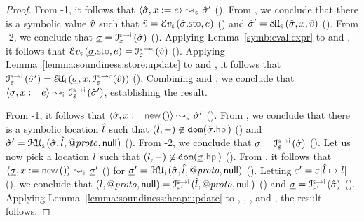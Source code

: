 \begin{proof}
 \noindent {} From \hyp{1}, it follows that $\absbsemrule{\sstate, \jvar := \jsilexpr}{\sstate'}{\symbolic}$ (). 
From , we conclude that there is a symbolic value $\hat{v}$ such that 
$\sexprv = \evalexpr{\symbolic}(\sstate.\stosel, \jsilexpr)$ () and $\sstate' = \stupdt{\symbolic}(\sstate, \jvar, \sexprv)$ (). 
From \hyp{2}, we conclude that $\istate = \interpret{\symbinst}{\senv}(\sstate)$ (). 
Applying Lemma~\ref{symb:eval:expr} to  and , it follows that 
$\evalexpr{\symbolic}(\istate.\stosel, \jsilexpr) = \interpret{\symbconc}{\senv}(\sexprv)$ (). 
Applying Lemma~\ref{lemma:soundiness:store:update} to  and , it follows
that $ \interpret{\symbinst}{\senv}(\sstate') = \stupdt{\instrumented}(\istate, \jvar, \interpret{\symbconc}{\senv}(\sexprv))$ (). 
Combining  and , we conclude that $\absbsemrule{\istate,\jvar := \jsilexpr}{\interpret{\symbinst}{\senv}(\sstate')}{\instrumented}$, establishing the result. 
\vspace{5pt}

 \noindent {} From \hyp{1}, it follows that $\absbsemrule{\sstate, \jvar := \jsilnew()}{\sstate'}{\symbolic}$ (). 
From , we conclude that there is a symbolic location $\hat{l}$ such that $(\sloc, -) \not\in \domain(\sstate.\hpsel)$ () and 
$\sstate' = \hpupdt{\symbolic}(\sstate, \sloc, \protop, \jnull)$ (). From \hyp{2}, 
we conclude that $\istate = \interpret{\symbinst}{\senv}(\sstate)$ (). 
Let us now pick a location $l$ such that $(\loc, -) \not\in \domain(\istate.\hpsel)$ (). 
From , it follows that $\absbsemrule{\istate, \jvar := \jsilnew()}{\istate'}{\instrumented}$ () for 
$\istate' = \hpupdt{\instrumented}(\sstate, \sloc, \protop, \jnull)$ (). 
Letting $\varepsilon' = \varepsilon[\hat{l} \mapsto l]$ (), we conclude that 
$(\loc, \protop, \jnull) = \interpret{\symbinst}{\senv'}(\sloc, \protop, \jnull)$ ()
and $\istate = \interpret{\symbinst}{\senv'}(\sstate)$ (). 
Applying Lemma~\ref{lemma:soundiness:heap:update} to , , , and , 
the result follows. 
\vspace{5pt}


\end{proof}

